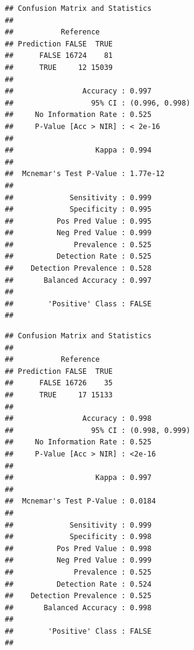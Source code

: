 \documentclass[
]{article}
\newenvironment{Shaded}{\begin{snugshade}}{\end{snugshade}}
\newcommand{\CommentTok}[1]{\textcolor[rgb]{0.56,0.35,0.01}{\textit{#1}}}
\newcommand{\FunctionTok}[1]{\textcolor[rgb]{0.00,0.00,0.00}{#1}}
\newcommand{\NormalTok}[1]{#1}
\newcommand{\SpecialCharTok}[1]{\textcolor[rgb]{0.00,0.00,0.00}{#1}}
\begin{document}
\begin{Shaded}
\end{Shaded}

\begin{verbatim}
## Confusion Matrix and Statistics
## 
##           Reference
## Prediction FALSE  TRUE
##      FALSE 16724    81
##      TRUE     12 15039
##                                         
##                Accuracy : 0.997         
##                  95% CI : (0.996, 0.998)
##     No Information Rate : 0.525         
##     P-Value [Acc > NIR] : < 2e-16       
##                                         
##                   Kappa : 0.994         
##                                         
##  Mcnemar's Test P-Value : 1.77e-12      
##                                         
##             Sensitivity : 0.999         
##             Specificity : 0.995         
##          Pos Pred Value : 0.995         
##          Neg Pred Value : 0.999         
##              Prevalence : 0.525         
##          Detection Rate : 0.525         
##    Detection Prevalence : 0.528         
##       Balanced Accuracy : 0.997         
##                                         
##        'Positive' Class : FALSE         
## 
\end{verbatim}

\begin{Shaded}
\end{Shaded}

\begin{verbatim}
## Confusion Matrix and Statistics
## 
##           Reference
## Prediction FALSE  TRUE
##      FALSE 16726    35
##      TRUE     17 15133
##                                         
##                Accuracy : 0.998         
##                  95% CI : (0.998, 0.999)
##     No Information Rate : 0.525         
##     P-Value [Acc > NIR] : <2e-16        
##                                         
##                   Kappa : 0.997         
##                                         
##  Mcnemar's Test P-Value : 0.0184        
##                                         
##             Sensitivity : 0.999         
##             Specificity : 0.998         
##          Pos Pred Value : 0.998         
##          Neg Pred Value : 0.999         
##              Prevalence : 0.525         
##          Detection Rate : 0.524         
##    Detection Prevalence : 0.525         
##       Balanced Accuracy : 0.998         
##                                         
##        'Positive' Class : FALSE         
## 
\end{verbatim}
\end{document}
